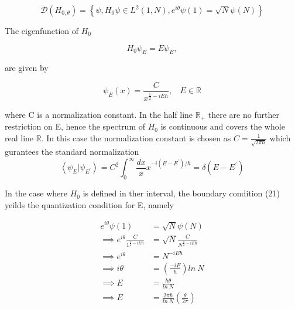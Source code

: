 \documentclass[12pt, letterpaper]{article}
\newcommand*{\1}{\hspace{1pt}}
\begin{document}
        \begin{equation}
             \mathcal{D}(H_{0,\theta}) = \left\{\psi, H_{0}\psi \in  L^{2} (1, N), e^{i\theta}\psi(1) = \sqrt{N}\psi(N)\right\}
        \end{equation}

        The eigenfunction of $H_{0}$ 

        \begin{equation}
            H_{0}\psi_{E} = E \psi_{E},
        \end{equation}

        are given by \cite{s1}

        \begin{equation}
            \psi _{E} (x) = \frac{C}{x^{\frac{1}{2}-iE\hbar}} , \ \ \ \ E \in \mathbb{R} 
        \end{equation}

        where C is a normalization constant. In the half line $\mathbb{R}_{+}$ there are no further restriction on E, hence the spectrum of $H_{0}$ is continuous 
        and covers the whole real line $\mathbb{R}$. In this case the normalization constant is chosen as $C = \frac{1}{\sqrt{2\pi\hbar}}$ which gurantees the standard 
        normalization
        \begin{equation}
            \left\langle\psi_{E}|\psi_{E^{'}}\right\rangle = C^{2} \int_{0}^{\infty} \frac{dx}{x} x^{-i(E-E^{'})/\hbar} = \delta (E-E^{'}) 
        \end{equation}

        In the case where $H_{0}$ is defined in ther interval, the boundary condition (21) yeilds the quantization condition for E, namely

        \begin{equation*}
            \begin{split}
                e^{i\theta} \psi(1) & = \sqrt{N}\psi(N) \\ 
                \implies e^{i\theta} \frac{C}{1^{\frac{1}{2}-iE\hbar}}&= \sqrt{N}\frac{C}{N^{\frac{1}{2}-iE\hbar}} \\ 
                \implies e^{i\theta} & = N^{-iE\hbar} \\ 
                \implies i\theta & = (\frac{-iE}{\hbar})ln \ N \\
                \implies E & = \frac{\hbar\theta}{ln \ N} \\
                \implies E & = \frac{2\pi\hbar}{ln \ N}( \frac{\theta}{2\pi}) \\
            \end{split}
        \end{equation*}
\end{document}
